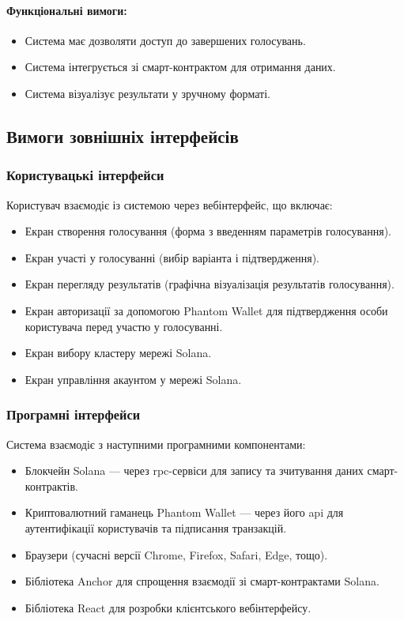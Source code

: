 \documentclass[14pt]{extreport}
\newcounter{req}[subsubsection]
\newcommand\req{\arabic{req}\stepcounter{req}}
\begin{document}
  \paragraph{Функціональні вимоги:}  
  \begin{itemize}[leftmargin=*,label=REQ-.\req:]  
      \item Система має дозволяти доступ до завершених голосувань.  
      \item Система інтегрується зі смарт-контрактом для отримання даних.  
      \item Система візуалізує результати у зручному форматі.
  \end{itemize}  

  \subsection{Вимоги зовнішніх інтерфейсів}
  \subsubsection{Користувацькі інтерфейси}
  Користувач взаємодіє із системою через вебінтерфейс, що включає:
  \begin{itemize}
    \item Екран створення голосування (форма з введенням параметрів голосування).
    \item Екран участі у голосуванні (вибір варіанта і підтвердження).
    \item Екран перегляду результатів (графічна візуалізація результатів голосування).
    \item Екран авторизації за допомогою Phantom Wallet для підтвердження особи користувача перед участю у голосуванні.
    \item Екран вибору кластеру мережі Solana.
    \item Екран управління акаунтом у мережі Solana.
  \end{itemize}
  
  \subsubsection{Програмні інтерфейси}
  Система взаємодіє з наступними програмними компонентами:
  \begin{itemize}
    \item Блокчейн Solana — через \gls{rpc}-сервіси для запису та зчитування даних смарт-контрактів.
    \item Криптовалютний гаманець Phantom Wallet — через його \gls{api} для аутентифікації користувачів та підписання транзакцій.
    \item Браузери (сучасні версії Chrome, Firefox, Safari, Edge, тощо).
    \item Бібліотека Anchor для спрощення взаємодії зі смарт-контрактами Solana.
    \item Бібліотека React для розробки клієнтського вебінтерфейсу.
  \end{itemize}
  
\end{document}
